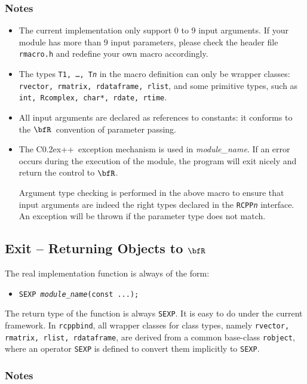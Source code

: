\documentclass{article}
\def\C++{C{\raise 0.2ex\hbox{++}}}
\newcommand{\R}{$\bfR$}
\begin{document}
\subsubsection*{Notes}
\begin{itemize}
  \item The current implementation only support 0 to 9 input
    arguments. If your module has more than 9 input
    parameters, please check the header file
    \texttt{rmacro.h} and redefine your own macro
    accordingly.
  \item The types \texttt{T1, \ldots, T\textsl{n}} in the
    macro definition can only be wrapper classes:
    \texttt{rvector, rmatrix, rdataframe, rlist}, and some
    primitive types, such as \texttt{int, Rcomplex, char*,
    rdate, rtime}.
  \item All input arguments are declared as references to
    constants: it conforms to the \R\ convention of parameter
    passing.
  \item The \C++\ exception mechanism is used in
    \textsl{module\_name}. If an error occurs during the
    execution of the module, the program will exit nicely and
    return the control to \R.
  
    Argument type checking is performed in the above macro to
    ensure that input arguments are indeed the right types
    declared in the \texttt{RCPP\textsl{n}} interface. An
    exception will be thrown if the parameter type does not
    match.
\end{itemize}

\subsection{Exit -- Returning Objects to \R}

The real implementation function is always of the form:
\begin{itemize}
  \item[] \texttt{SEXP \textsl{module\_name}(const ...);}
\end{itemize}
The return type of the function is always \texttt{SEXP}. It
is easy to do under the current framework.  In
\texttt{rcppbind}, all wrapper classes for class types,
namely \texttt{rvector, rmatrix, rlist, rdataframe}, are
derived from a common base-class \texttt{robject}, where an
operator \texttt{SEXP} is defined to convert them implicitly
to \texttt{SEXP}.

\subsubsection*{Notes}
\end{document}
